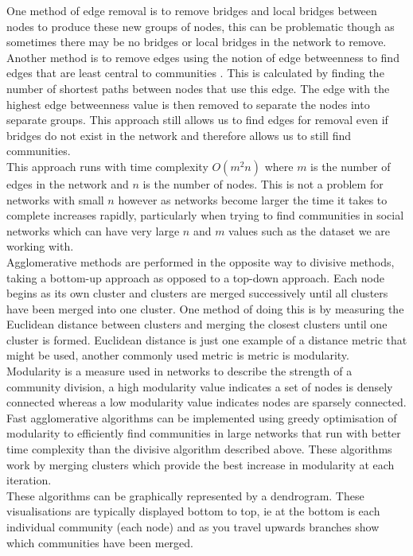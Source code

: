 \documentclass[conference]{IEEEtran}
\begin{document}
{			One method of edge removal is to remove bridges and local bridges between nodes to produce these new groups of nodes, this can be problematic though as sometimes there may be no bridges or local bridges in the network to remove. Another method is to remove edges using the notion of edge betweenness to find edges that are least central to communities \cite{gnewman}. This is calculated by finding the number of shortest paths between nodes that use this edge. The edge with the highest edge betweenness value is then removed to separate the nodes into separate groups. This approach still allows us to find edges for removal even if bridges do not exist in the network and therefore allows us to still find communities. \\
			This approach runs with time complexity $O(m^{2}n)$ where $m$ is the number of edges in the network and $n$ is the number of nodes. This is not a problem for networks with small $n$ however as networks become larger the time it takes to complete increases rapidly, particularly when trying to find communities in social networks which can have very large $n$ and $m$ values such as the dataset we are working with. \\
			
			Agglomerative methods are performed in the opposite way to divisive methods, taking a bottom-up approach as opposed to a top-down approach. Each node begins as its own cluster and clusters are merged successively until all clusters have been merged into one cluster. One method of doing this is by measuring the Euclidean distance between clusters and merging the closest clusters until one cluster is formed. Euclidean distance is just one example of a distance metric that might be used, another commonly used metric is metric is modularity. Modularity is a measure used in networks to describe the strength of a community division, a high modularity value indicates a set of nodes is densely connected whereas a low modularity value indicates nodes are sparsely connected. Fast agglomerative algorithms can be implemented using greedy optimisation of modularity to efficiently find communities in large networks \cite{cnewman} \cite{louvain} that run with better time complexity than the divisive algorithm described above. These algorithms work by merging clusters which provide the best increase in modularity at each iteration.\\
			These algorithms can be graphically represented by a dendrogram. These visualisations are typically displayed bottom to top, ie at the bottom is each individual community (each node) and as you travel upwards branches show which communities have been merged. 
		\par}
	
\end{document}
